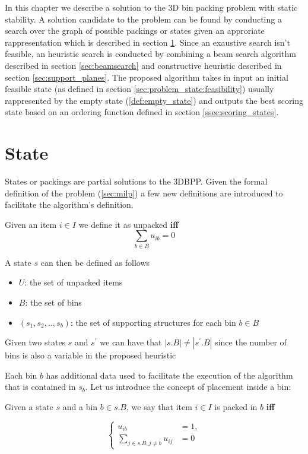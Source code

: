 In this chapter we describe a solution to the 3D bin packing problem with static stability.
A solution candidate to the problem can be found by conducting a search over the graph of possible packings or states given an approriate rappresentation which is described in section \ref{sec:problem_state}.
Since an exaustive search isn't feasible, an heuristic search is conducted by combining a beam search algorithm described in section \ref{sec:beamsearch} and constructive heuristic described in section \ref{sec:support_planes}.
The proposed algorithm takes in input an initial feasible state (as defined in section \ref{sec:problem_state:feasibility}) usually rappresented by the empty state (\ref{def:empty_state}) and outputs the best scoring state based on an ordering function defined in section \ref{ssec:scoring_states}.

\section{State}
\label{sec:problem_state}%
States or packings are partial solutions to the 3DBPP. Given the formal definition of the problem (\ref{sec:milp}) a few new definitions are introduced to facilitate the algorithm's definition.
\begin{definition}
    Given an item $i \in I$ we define it as unpacked \textbf{iff}
    \begin{equation*}
        \sum_{b \in B} u_{ib} = 0
    \end{equation*}
\end{definition}
A state $s$ can then be defined as follows
\begin{itemize}
    \item $U$: the set of unpacked items
    \item $B$: the set of bins
    \item $(s_1, s_2,.., s_b)$: the set of supporting structures for each bin $b \in B$
\end{itemize}

\begin{observation}
    Given two states $s$ and $s^\prime$ we can have that $|s.B| \neq |s^\prime.B|$ since the number of bins is also a variable in the proposed heuristic
\end{observation}

Each bin $b$ has additional data used to facilitate the execution of the algorithm that is contained in $s_b$. 
Let us introduce the concept of placement inside a bin:
\begin{definition}
    Given a state $s$ and a bin $b \in s.B$, we say that item $i \in I$ is packed in $b$ \textbf{iff} 
    
    \begin{equation*}
        \left\{ 
            \begin{aligned}
                u_{ib} & = 1, \\
                \sum_{j \in s.B, j \neq b}{u_{ij}} & = 0
            \end{aligned}
        \right.
    \end{equation*}
\end{definition}

